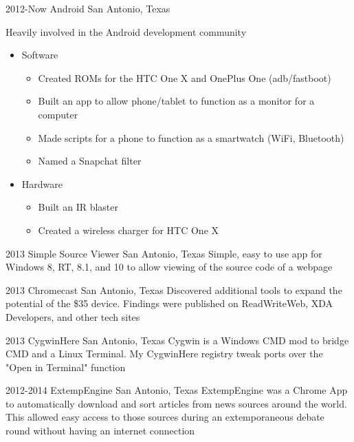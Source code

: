\documentclass[]{friggeri-cv} %
\begin{document}
\begin{entrylist}


\entry
{2012-Now}
{Android}
{San Antonio, Texas}
{Heavily involved in the Android development community 
\begin{itemize}
	\item Software
	\begin{itemize} 
		\item Created ROMs for the HTC One X and OnePlus One (adb/fastboot)  
		\item Built an app to allow phone/tablet to function as a  monitor for a computer
		\item Made scripts for a phone to function as a smartwatch (WiFi, Bluetooth)
		\item Named a Snapchat filter 
	\end{itemize} 
	\item Hardware 
	\begin{itemize}
		\item Built an IR blaster 
		\item Created a wireless charger for HTC One X 
	\end{itemize}
\end{itemize}
}


\entry
{2013}
{Simple Source Viewer}
{San Antonio, Texas}
{Simple, easy to use app for Windows 8, RT, 8.1, and 10 to allow viewing of the source code of a webpage}


\entry
{2013}
{Chromecast}
{San Antonio, Texas}
{Discovered additional tools to expand the potential of the \$35 device. Findings were published on ReadWriteWeb, XDA Developers, and other tech sites}


\entry
{2013}
{CygwinHere}
{San Antonio, Texas}
{Cygwin is a Windows CMD mod to bridge CMD and a Linux Terminal. My CygwinHere registry tweak ports over the "Open in Terminal" function}


\entry
{2012-2014}
{ExtempEngine}
{San Antonio, Texas}
{ExtempEngine was a Chrome App to automatically download and sort articles from news sources around the world. This allowed easy access to those sources during an extemporaneous debate round without having an internet connection}


\end{entrylist}
\pagebreak 
\end{document}
